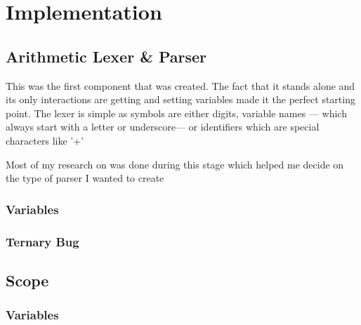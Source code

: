 \chapter{Implementation}




\section{Arithmetic Lexer \& Parser}
This was the first component that was created.
The fact that it stands alone and its only interactions are getting and setting variables made it the perfect starting point.
The lexer is simple as symbols are either digits, variable names --- which always start with a letter or underscore--- or identifiers which are special characters like '+'


Most of my research on was done during this stage which helped me decide on the type of parser I wanted to create

\subsection{Variables}
\subsection{Ternary Bug}

\section{Scope}

\subsection{Variables}
